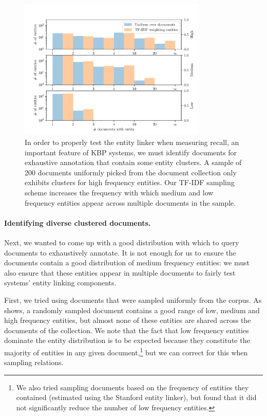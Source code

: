 \begin{figure}
  \centering
  \includegraphics[width=0.8\textwidth]{figures/analysis/exhaustive_entity_cross}
  \caption[Comparison of document sampling distributions]{\label{fig:kbpo:exhaustive-entity}
  In order to properly test the entity linker when measuring recall, an important feature of KBP systems, we must identify documents for exhaustive annotation that contain some entity clusters.
  A sample of 200 documents uniformly picked from the document collection only exhibits clusters for high frequency entities.
  Our TF-IDF sampling scheme increases the frequency with which medium and low frequency entities appear across multiple documents in the sample.
  }
\end{figure}


\paragraph{Identifying diverse clustered documents.}
Next, we wanted to come up with a good distribution with which to query documents to exhaustively annotate.
It is not enough for us to ensure the documents contain a good distribution of medium frequency entities: we must also ensure that these entities appear in multiple documents to fairly test systems' entity linking components.

First, we tried using documents that were sampled uniformly from the corpus.
As  shows, 
a randomly sampled document contains a good range of low, medium and high frequency entities, but almost none of these entities are shared across the documents of the collection.
We note that the fact that low frequency entities dominate the entity distribution is to be expected because they constitute the majority of entities in any given document,\footnote{%
  We also tried sampling documents based on the frequency of entities they contained (estimated using the Stanford entity linker), but found that it did not significantly reduce the number of low frequency entities.} but we can correct for this when sampling relations.

